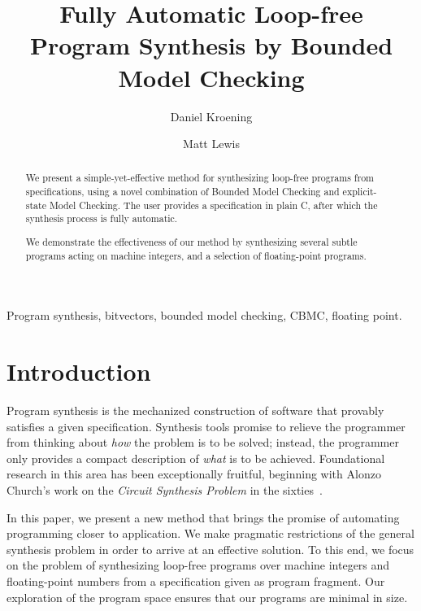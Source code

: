 \documentclass[a4paper]{llncs}
\title{Fully Automatic Loop-free Program Synthesis by Bounded Model Checking}
\author{Daniel Kroening \and Matt Lewis}
\institute{University of Oxford}
\newenvironment{keywords}{
       \list{}{\advance\topsep by0.35cm\relax\small
       \leftmargin=0cm
       \labelwidth=0.35cm
       \listparindent=0.35cm
       \itemindent\listparindent
       \rightmargin\leftmargin}\item[\hskip\labelsep
                                     \bfseries Keywords:]}
     {\endlist}
\begin{document}
%
\maketitle
%
\pagestyle{headings}  %

\begin{abstract}

We present a simple-yet-effective method for synthesizing loop-free programs
from specifications, using a novel combination of Bounded Model Checking and
explicit-state Model Checking.  The user provides a specification in plain
C, after which the synthesis process is fully automatic.

We demonstrate the effectiveness of our method by synthesizing several subtle
programs acting on machine integers, and a selection of floating-point programs.
\end{abstract}


\begin{keywords}
 Program synthesis, bitvectors, bounded model checking, CBMC,
 floating point.
\end{keywords}

\section{Introduction}

Program synthesis is the mechanized construction of software that provably
satisfies a given specification.  Synthesis tools promise to relieve the
programmer from thinking about \emph{how} the problem is to be solved;
instead, the programmer only provides a compact description of \emph{what}
is to be achieved.  Foundational research in this area has been
exceptionally fruitful, beginning with Alonzo Church's work on the
\emph{Circuit Synthesis Problem} in the sixties~\cite{church-synth}.

In this paper, we present a new method that brings the promise of
automating programming closer to application.  We make pragmatic
restrictions of the general synthesis problem in order to arrive at an
effective solution.  To this end, we focus on the problem of synthesizing
loop-free programs over machine integers and floating-point numbers from a
specification given as program fragment.  Our exploration of the program
space ensures that our programs are minimal in size.
\end{document}
